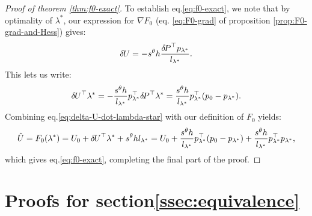 \documentclass[smallcondensed]{svjour3}
\begin{document}
\begin{proof}[Proof of theorem \ref{thm:f0-exact}]
  To establish eq.\@ \ref{eq:f0-exact}, we note that by optimality
  of $\lambda^*$, our expression for $\nabla F_0$ (eq.\@
  \ref{eq:F0-grad} of proposition \ref{prop:F0-grad-and-Hess}) gives:
  \begin{equation}
    {\delta \hspace{-0.09em} U} = -s^\theta h \frac{{\delta \hspace{-0.14em} P}^\top p_{\lambda^*}}{l_{\lambda^*}}.
  \end{equation}
  This lets us write:
  \begin{equation}\label{eq:delta-U-dot-lambda-star}
    {\delta \hspace{-0.09em} U}^\top \lambda^* = -\frac{s^\theta h}{l_{\lambda^*}} p_{\lambda^*}^\top {\delta \hspace{-0.14em} P}^\top \lambda^* = \frac{s^\theta h}{l_{\lambda^*}} p_{\lambda^*}^\top {(p_0 - p_{\lambda^*})}.
  \end{equation}
  Combining eq.\@ \ref{eq:delta-U-dot-lambda-star} with our
  definition of $F_0$ yields:
  \begin{equation}
    \hat{U} = F_0(\lambda^*) = U_0 + {\delta \hspace{-0.09em} U}^\top \lambda^* + s^\theta h l_{\lambda^*} = U_0 + \frac{s^\theta h}{l_{\lambda^*}} p_{\lambda^*}^\top {(p_0 - p_{\lambda^*})} + \frac{s^\theta h}{l_{\lambda^*}} p_{\lambda^*}^\top p_{\lambda^*},
  \end{equation}
  which gives eq.\@ \ref{eq:f0-exact}, completing the final part of
  the proof.
\end{proof}

\section{Proofs for section\@ \ref{ssec:equivalence}}\label{sec:equivalence-proofs}
\end{document}

